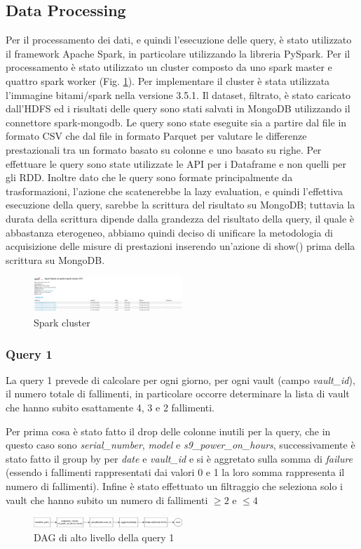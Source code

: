 \documentclass[conference]{IEEEtran}
\begin{document}
\subsection{Data Processing}
Per il processamento dei dati, e quindi l'esecuzione delle query, è stato utilizzato il framework Apache Spark, in particolare utilizzando la libreria PySpark. Per il processamento è stato utilizzato un cluster composto da uno spark master e quattro spark worker (Fig. \ref{fig:spark_cluster}). Per implementare il cluster è stata utilizzata l'immagine bitami/spark nella versione 3.5.1.
Il dataset, filtrato, è stato caricato dall'HDFS ed i risultati delle query sono stati salvati in MongoDB utilizzando il connettore spark-mongodb.
Le query sono state eseguite sia a partire dal file in formato CSV che dal file in formato Parquet per valutare le differenze prestazionali tra un formato basato su colonne e uno basato su righe.
Per effettuare le query sono state utilizzate le API per i Dataframe e non quelli per gli RDD. 
Inoltre dato che le query sono formate principalmente da trasformazioni, l'azione che scatenerebbe la lazy evaluation, e quindi l'effettiva esecuzione della query, sarebbe la scrittura del risultato su MongoDB; tuttavia la durata della scrittura dipende dalla grandezza del risultato della query, il quale è abbastanza eterogeneo, abbiamo quindi deciso di unificare la metodologia di acquisizione delle misure di prestazioni inserendo un'azione di show() prima della scrittura su MongoDB.
\begin{figure}[H]
    \centering
    \includegraphics[width=0.5\textwidth]{./res/spark_cluster.png}
    \caption{Spark cluster}
    \label{fig:spark_cluster}
\end{figure}
\subsubsection{Query 1}
La query 1 prevede di calcolare per ogni giorno, per ogni vault (campo \textit{vault\_id}), il numero totale di fallimenti, in particolare occorre determinare la lista di vault che hanno subito esattamente 4, 3 e 2 fallimenti.

Per prima cosa è stato fatto il drop delle colonne inutili per la query, che in questo caso sono \textit{serial\_number}, \textit{model} e \textit{s9\_power\_on\_hours}, successivamente è stato fatto il group by per \textit{date} e \textit{vault\_id} e si è aggretato sulla somma di \textit{failure} (essendo i fallimenti rappresentati dai valori 0 e 1 la loro somma rappresenta il numero di fallimenti). Infine è stato effettuato un filtraggio che seleziona solo i vault che hanno subito un numero di fallimenti $\geq2$ e $\leq4$
\begin{figure}[H]
    \centerline{\includegraphics[width=0.5\textwidth]{res/query1_dag.png}}
    \caption{DAG di alto livello della query 1}
    \label{fig:dag_query1}
\end{figure}
\end{document}
